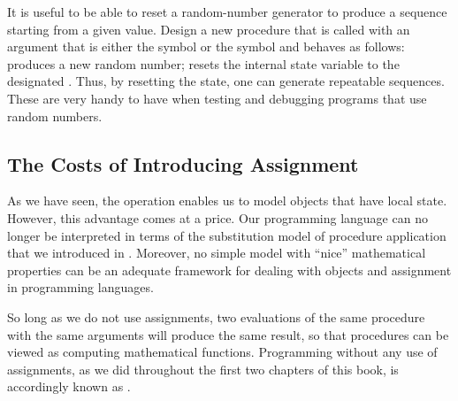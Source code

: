 \begin{exercise}
	\label{Exercise 3.6}
	It is useful to be able to reset a random-number generator to produce a sequence starting from a given value.
	Design a new  procedure that is called with an argument that is either the symbol  or the symbol  and behaves as follows:
	 produces a new random number;
	 resets the internal state variable to the designated .
	Thus, by resetting the state, one can generate repeatable sequences.
	These are very handy to have when testing and debugging programs that use random numbers.
\end{exercise}



\subsection{The Costs of Introducing Assignment}
\label{Section 3.1.3}

As we have seen, the  operation enables us to model objects that have local state.
However, this advantage comes at a price.
Our programming language can no longer be interpreted in terms of the substitution model of procedure application that we introduced in .
Moreover, no simple model with “nice” mathematical properties can be an adequate framework for dealing with objects and assignment in programming languages.

So long as we do not use assignments, two evaluations of the same procedure with the same arguments will produce the same result, so that procedures can be viewed as computing mathematical functions.
Programming without any use of assignments, as we did throughout the first two chapters of this book, is accordingly known as .

